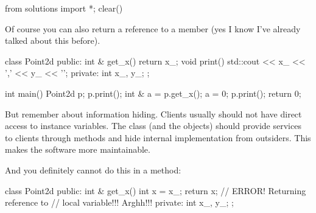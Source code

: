 \begin{python0}
from solutions import *; clear()
\end{python0}

Of course you can also return a reference to a member (yes I know
I've already talked about this before).

\begin{consolethree}[escapeinside=||]
class Point2d
{
public:
    int & get_x()
    {
        return x_;
    }
    void print()
    {
        std::cout << x_ << ',' << y_ << '\n';
    }
private:
    int x_, y_;
};

int main()
{
    Point2d p;
    p.print();
    int & a = p.get_x();
    a = 0;
    p.print();
    return 0;
}
\end{consolethree}

But remember about information hiding. Clients usually should not have
direct access to instance variables. The class (and the objects) should
provide services to clients through methods and hide internal
implementation from outsiders. This makes the software more
maintainable.

And you definitely cannot do this in a method:

\begin{consolethree}[escapeinside=||]
class Point2d
{
public:
    int & get_x()
    {
        int x = x_;
        return x; // ERROR! Returning reference to
                  // local variable!!! Arghh!!!
    }
private:
    int x_, y_;
};
\end{consolethree}


